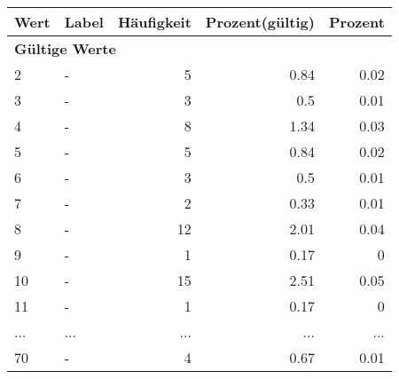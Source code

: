      \begin{longtable}{lXrrr}
     \toprule
     \textbf{Wert} & \textbf{Label} & \textbf{Häufigkeit} & \textbf{Prozent(gültig)} & \textbf{Prozent} \\
     \endhead
     \midrule
     \multicolumn{5}{l}{\textbf{Gültige Werte}}\\
        2 & \multicolumn{1}{X}{-} & %
          \num{5} &
          \num[round-mode=places,round-precision=2]{0.84} &
          \num[round-mode=places,round-precision=2]{0.02} \\
        3 & \multicolumn{1}{X}{-} & %
          \num{3} &
          \num[round-mode=places,round-precision=2]{0.5} &
          \num[round-mode=places,round-precision=2]{0.01} \\
        4 & \multicolumn{1}{X}{-} & %
          \num{8} &
          \num[round-mode=places,round-precision=2]{1.34} &
          \num[round-mode=places,round-precision=2]{0.03} \\
        5 & \multicolumn{1}{X}{-} & %
          \num{5} &
          \num[round-mode=places,round-precision=2]{0.84} &
          \num[round-mode=places,round-precision=2]{0.02} \\
        6 & \multicolumn{1}{X}{-} & %
          \num{3} &
          \num[round-mode=places,round-precision=2]{0.5} &
          \num[round-mode=places,round-precision=2]{0.01} \\
        7 & \multicolumn{1}{X}{-} & %
          \num{2} &
          \num[round-mode=places,round-precision=2]{0.33} &
          \num[round-mode=places,round-precision=2]{0.01} \\
        8 & \multicolumn{1}{X}{-} & %
          \num{12} &
          \num[round-mode=places,round-precision=2]{2.01} &
          \num[round-mode=places,round-precision=2]{0.04} \\
        9 & \multicolumn{1}{X}{-} & %
          \num{1} &
          \num[round-mode=places,round-precision=2]{0.17} &
          \num[round-mode=places,round-precision=2]{0} \\
        10 & \multicolumn{1}{X}{-} & %
          \num{15} &
          \num[round-mode=places,round-precision=2]{2.51} &
          \num[round-mode=places,round-precision=2]{0.05} \\
        11 & \multicolumn{1}{X}{-} & %
          \num{1} &
          \num[round-mode=places,round-precision=2]{0.17} &
          \num[round-mode=places,round-precision=2]{0} \\
       ... & ... & ... & ... & ... \\
        70 & \multicolumn{1}{X}{-} & %
          \num{4} &
          \num[round-mode=places,round-precision=2]{0.67} &
          \num[round-mode=places,round-precision=2]{0.01} \\


\end{longtable}
